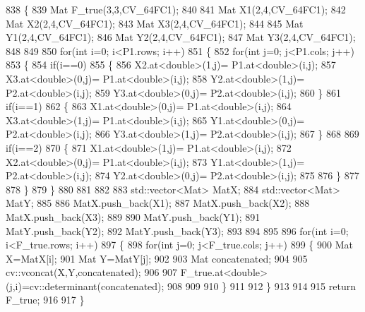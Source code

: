 \begin{DoxyCode}
838 \{
839     Mat F\_true(3,3,CV\_64FC1);
840 
841     Mat X1(2,4,CV\_64FC1);
842     Mat X2(2,4,CV\_64FC1);
843     Mat X3(2,4,CV\_64FC1);
844 
845     Mat Y1(2,4,CV\_64FC1);
846     Mat Y2(2,4,CV\_64FC1);
847     Mat Y3(2,4,CV\_64FC1);
848 
849 
850     \textcolor{keywordflow}{for}(\textcolor{keywordtype}{int} i=0; i<P1.rows; i++)
851     \{
852         \textcolor{keywordflow}{for}(\textcolor{keywordtype}{int} j=0; j<P1.cols; j++)
853         \{
854             \textcolor{keywordflow}{if}(i==0)
855             \{
856                 X2.at<\textcolor{keywordtype}{double}>(1,j)= P1.at<\textcolor{keywordtype}{double}>(i,j);
857                 X3.at<\textcolor{keywordtype}{double}>(0,j)= P1.at<\textcolor{keywordtype}{double}>(i,j);
858                 Y2.at<\textcolor{keywordtype}{double}>(1,j)= P2.at<\textcolor{keywordtype}{double}>(i,j);
859                 Y3.at<\textcolor{keywordtype}{double}>(0,j)= P2.at<\textcolor{keywordtype}{double}>(i,j);
860             \}
861             \textcolor{keywordflow}{if}(i==1)
862             \{
863                 X1.at<\textcolor{keywordtype}{double}>(0,j)= P1.at<\textcolor{keywordtype}{double}>(i,j);
864                 X3.at<\textcolor{keywordtype}{double}>(1,j)= P1.at<\textcolor{keywordtype}{double}>(i,j);
865                 Y1.at<\textcolor{keywordtype}{double}>(0,j)= P2.at<\textcolor{keywordtype}{double}>(i,j);
866                 Y3.at<\textcolor{keywordtype}{double}>(1,j)= P2.at<\textcolor{keywordtype}{double}>(i,j);
867             \}
868 
869             \textcolor{keywordflow}{if}(i==2)
870             \{
871                 X1.at<\textcolor{keywordtype}{double}>(1,j)= P1.at<\textcolor{keywordtype}{double}>(i,j);
872                 X2.at<\textcolor{keywordtype}{double}>(0,j)= P1.at<\textcolor{keywordtype}{double}>(i,j);
873                 Y1.at<\textcolor{keywordtype}{double}>(1,j)= P2.at<\textcolor{keywordtype}{double}>(i,j);
874                 Y2.at<\textcolor{keywordtype}{double}>(0,j)= P2.at<\textcolor{keywordtype}{double}>(i,j);
875 
876             \}
877 
878         \}
879     \}
880 
881 
882 
883     std::vector<Mat> MatX;
884     std::vector<Mat> MatY;
885 
886     MatX.push\_back(X1);
887     MatX.push\_back(X2);
888     MatX.push\_back(X3);
889 
890     MatY.push\_back(Y1);
891     MatY.push\_back(Y2);
892     MatY.push\_back(Y3);
893 
894 
895 
896     \textcolor{keywordflow}{for}(\textcolor{keywordtype}{int} i=0; i<F\_true.rows; i++)
897     \{
898         \textcolor{keywordflow}{for}(\textcolor{keywordtype}{int} j=0; j<F\_true.cols; j++)
899         \{
900             Mat X=MatX[i];
901             Mat Y=MatY[j];
902 
903             Mat concatenated;
904 
905             cv::vconcat(X,Y,concatenated);
906 
907             F\_true.at<\textcolor{keywordtype}{double}>(j,i)=cv::determinant(concatenated);
908 
909 
910         \}
911 
912     \}
913 
914 
915     \textcolor{keywordflow}{return} F\_true;
916 
917 \}
\end{DoxyCode}
\mbox{\label{classStereoCamera_aeb1cf4e41058cd70c7df6b8c2511548d}} 

